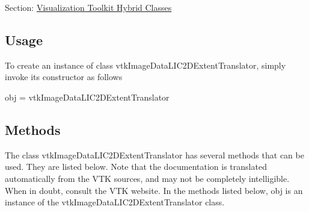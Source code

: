 Section\-: \hyperlink{sec_vtkhybrid}{Visualization Toolkit Hybrid Classes} \hypertarget{vtkwidgets_vtkxyplotwidget_Usage}{}\subsection{Usage}\label{vtkwidgets_vtkxyplotwidget_Usage}
To create an instance of class vtk\-Image\-Data\-L\-I\-C2\-D\-Extent\-Translator, simply invoke its constructor as follows \begin{DoxyVerb}  obj = vtkImageDataLIC2DExtentTranslator
\end{DoxyVerb}
 \hypertarget{vtkwidgets_vtkxyplotwidget_Methods}{}\subsection{Methods}\label{vtkwidgets_vtkxyplotwidget_Methods}
The class vtk\-Image\-Data\-L\-I\-C2\-D\-Extent\-Translator has several methods that can be used. They are listed below. Note that the documentation is translated automatically from the V\-T\-K sources, and may not be completely intelligible. When in doubt, consult the V\-T\-K website. In the methods listed below, {\ttfamily obj} is an instance of the vtk\-Image\-Data\-L\-I\-C2\-D\-Extent\-Translator class. 
